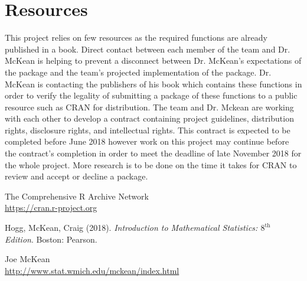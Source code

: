 \documentclass[12pt]{article}
\begin{document}
\section{Resources}
This project relies on few resources as the required functions are already published in a book. Direct contact between each member of the team and Dr. McKean is helping to prevent a disconnect between Dr. McKean's expectations of the package and the team's projected implementation of the package. Dr. McKean is contacting the publishers of his book which contains these functions in order to verify the legality of submitting a package of these functions to a public resource such as CRAN for distribution. The team and Dr. Mckean are working with each other to develop a contract containing project guidelines, distribution rights, disclosure rights, and intellectual rights. This contract is expected to be completed before June 2018 however work on this project may continue before the contract's completion in order to meet the deadline of late November 2018 for the whole project. More research is to be done on the time it takes for CRAN to review and accept or decline a package.

\medskip

\begin{thebibliography}{9}
The Comprehensive R Archive Network\\
\url{https://cran.r-project.org}

Hogg, McKean, Craig (2018). \textit{Introduction to Mathematical Statistics: $8^\mathrm{th}$ Edition}. Boston: Pearson.

Joe McKean\\
\url{http://www.stat.wmich.edu/mckean/index.html}
\end{thebibliography}
\end{document}
